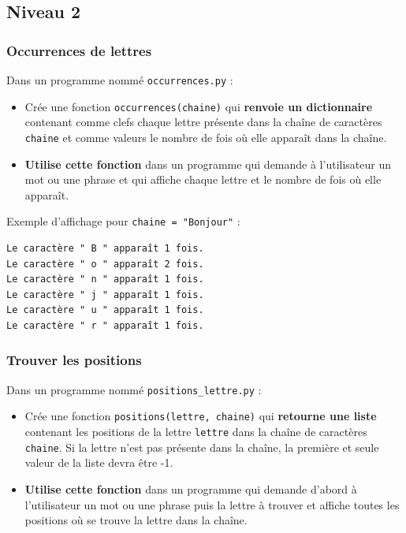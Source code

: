 \documentclass[11pt]{article}
\begin{document}
\subsection*{Niveau 2}
\label{chapitre8_niv2}
\subsubsection*{Occurrences de lettres}
\label{sec:org4e493c5}
Dans un programme nommé \texttt{occurrences.py} :
\begin{itemize}
\item Crée une fonction \texttt{occurrences(chaine)} qui \textbf{renvoie un dictionnaire} contenant comme clefs chaque lettre présente dans la chaîne de caractères \texttt{chaine} et comme valeurs le nombre de fois où elle apparaît dans la chaîne.
\item \textbf{Utilise cette fonction} dans un programme qui demande à l'utilisateur un mot ou une phrase et qui affiche chaque lettre et le nombre de fois où elle apparaît.
\end{itemize}
Exemple d'affichage pour \texttt{chaine = "Bonjour"} :
\begin{verbatim}
Le caractère " B " apparaît 1 fois.
Le caractère " o " apparaît 2 fois.
Le caractère " n " apparaît 1 fois.
Le caractère " j " apparaît 1 fois.
Le caractère " u " apparaît 1 fois.
Le caractère " r " apparaît 1 fois.
\end{verbatim}

\subsubsection*{Trouver les positions}
\label{sec:orge3336cc}
Dans un programme nommé \texttt{positions\_lettre.py} :
\begin{itemize}
\item Crée une fonction \texttt{positions(lettre, chaine)} qui \textbf{retourne une liste} contenant les positions de la lettre \texttt{lettre} dans la chaîne de caractères \texttt{chaine}. Si la lettre n'est pas présente dans la chaîne, la première et seule valeur de la liste devra être -1.
\item \textbf{Utilise cette fonction} dans un programme qui demande d'abord à l'utilisateur un mot ou une phrase puis la lettre à trouver et affiche toutes les positions où se trouve la lettre dans la chaîne.
\end{itemize}
\end{document}
